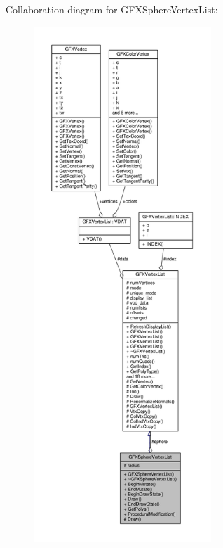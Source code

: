 Collaboration diagram for G\+F\+X\+Sphere\+Vertex\+List\+:
\nopagebreak
\begin{figure}[H]
\begin{center}
\leavevmode
\includegraphics[height=550pt]{d9/d46/classGFXSphereVertexList__coll__graph}
\end{center}
\end{figure}
